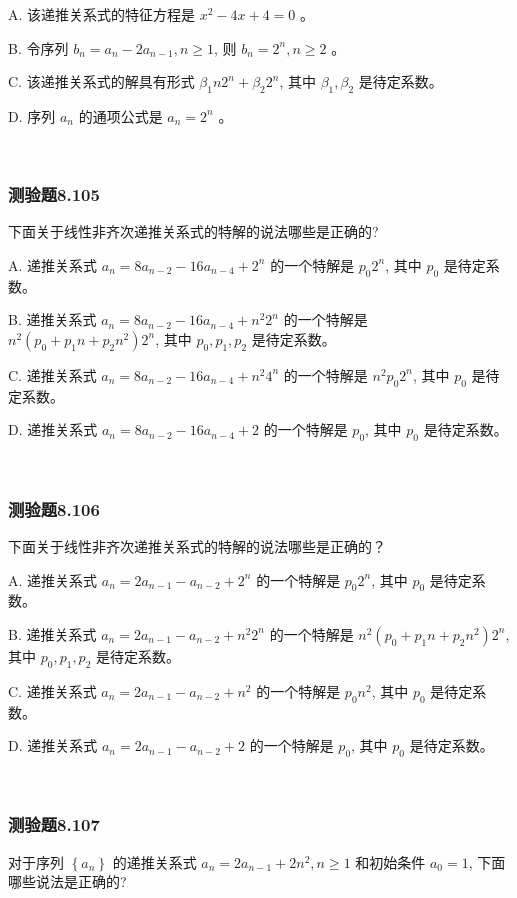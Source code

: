\documentclass[UTF8, heading=true]{ctexart}
\begin{document}
A. 该递推关系式的特征方程是 $x^2-4 x+4=0$ 。

B. 令序列 $b_n=a_n-2 a_{n-1}, n \geq 1$, 则 $b_n=2^n, n \geq 2$ 。

C. 该递推关系式的解具有形式 $\beta_1 n 2^n+\beta_2 2^n$, 其中 $\beta_1, \beta_2$ 是待定系数。

D. 序列 $a_n$ 的通项公式是 $a_n=2^n$ 。

\textcolor{white}{答案：ACD}

\subsubsection{测验题8.105}

下面关于线性非齐次递推关系式的特解的说法哪些是正确的?

A. 递推关系式 $a_n=8 a_{n-2}-16 a_{n-4}+2^n$ 的一个特解是 $p_0 2^n$, 其中 $p_0$ 是待定系数。

B. 递推关系式 $a_n=8 a_{n-2}-16 a_{n-4}+n^2 2^n$ 的一个特解是 $n^2\left(p_0+p_1 n+p_2 n^2\right) 2^n$, 其中 $p_0, p_1, p_2$ 是待定系数。

C. 递推关系式 $a_n=8 a_{n-2}-16 a_{n-4}+n^2 4^n$ 的一个特解是 $n^2 p_0 2^n$, 其中 $p_0$ 是待定系数。

D. 递推关系式 $a_n=8 a_{n-2}-16 a_{n-4}+2$ 的一个特解是 $p_0$, 其中 $p_0$ 是待定系数。

\textcolor{white}{答案：BD}

\subsubsection{测验题8.106}

下面关于线性非齐次递推关系式的特解的说法哪些是正确的？

A. 递推关系式 $a_n=2 a_{n-1}-a_{n-2}+2^n$ 的一个特解是 $p_0 2^n$, 其中 $p_0$ 是待定系数。

B. 递推关系式 $a_n=2 a_{n-1}-a_{n-2}+n^2 2^n$ 的一个特解是 $n^2\left(p_0+p_1 n+p_2 n^2\right) 2^n$, 其中 $p_0, p_1, p_2$ 是待定系数。

C. 递推关系式 $a_n=2 a_{n-1}-a_{n-2}+n^2$ 的一个特解是 $p_0 n^2$, 其中 $p_0$ 是待定系数。

D. 递推关系式 $a_n=2 a_{n-1}-a_{n-2}+2$ 的一个特解是 $p_0$, 其中 $p_0$ 是待定系数。

\textcolor{white}{答案：A}

\subsubsection{测验题8.107}
对于序列 $\left\{a_n\right\}$ 的递推关系式 $a_n=2 a_{n-1}+2 n^2, n \geq 1$ 和初始条件 $a_0=1$, 下面哪些说法是正确的?
\end{document}
